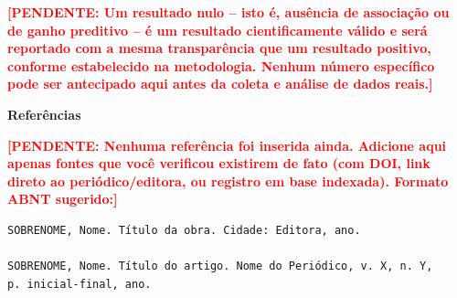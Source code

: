 \documentclass[12pt,a4paper]{article}
\newcommand{\pendente}[1]{\textcolor{red}{\textbf{[PENDENTE: #1]}}}
\begin{document}
\pendente{Um resultado nulo -- isto é, ausência de associação ou de ganho preditivo -- é um resultado cientificamente válido e será reportado com a mesma transparência que um resultado positivo, conforme estabelecido na metodologia. Nenhum número específico pode ser antecipado aqui antes da coleta e análise de dados reais.}

\newpage
\begin{center}
\textbf{Referências}
\end{center}
\vspace{0.5cm}

\pendente{Nenhuma referência foi inserida ainda. Adicione aqui apenas fontes que você verificou existirem de fato (com DOI, link direto ao periódico/editora, ou registro em base indexada). Formato ABNT sugerido:}

\begin{verbatim}
SOBRENOME, Nome. Título da obra. Cidade: Editora, ano.

SOBRENOME, Nome. Título do artigo. Nome do Periódico, v. X, n. Y,
p. inicial-final, ano.
\end{verbatim}
\end{document}

